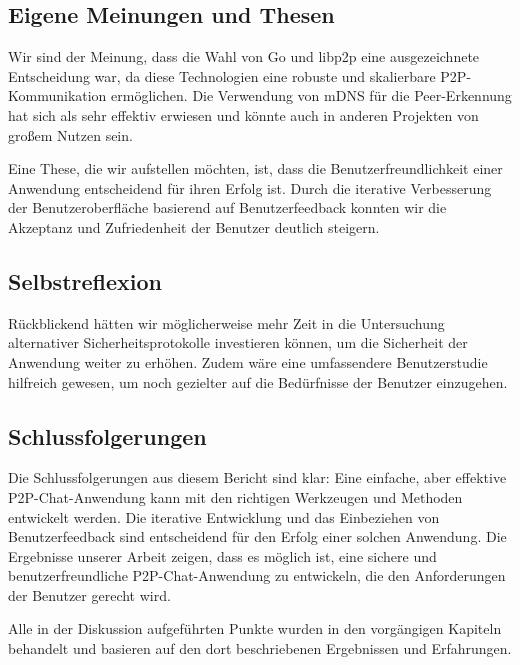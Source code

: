 \subsection{Eigene Meinungen und Thesen}

Wir sind der Meinung, dass die Wahl von Go und libp2p eine ausgezeichnete Entscheidung war, da diese Technologien eine robuste und skalierbare P2P-Kommunikation ermöglichen. Die Verwendung von mDNS für die Peer-Erkennung hat sich als sehr effektiv erwiesen und könnte auch in anderen Projekten von großem Nutzen sein.

Eine These, die wir aufstellen möchten, ist, dass die Benutzerfreundlichkeit einer Anwendung entscheidend für ihren Erfolg ist. Durch die iterative Verbesserung der Benutzeroberfläche basierend auf Benutzerfeedback konnten wir die Akzeptanz und Zufriedenheit der Benutzer deutlich steigern.

\subsection{Selbstreflexion}

Rückblickend hätten wir möglicherweise mehr Zeit in die Untersuchung alternativer Sicherheitsprotokolle investieren können, um die Sicherheit der Anwendung weiter zu erhöhen. Zudem wäre eine umfassendere Benutzerstudie hilfreich gewesen, um noch gezielter auf die Bedürfnisse der Benutzer einzugehen.

\subsection{Schlussfolgerungen}

Die Schlussfolgerungen aus diesem Bericht sind klar: Eine einfache, aber effektive P2P-Chat-Anwendung kann mit den richtigen Werkzeugen und Methoden entwickelt werden. Die iterative Entwicklung und das Einbeziehen von Benutzerfeedback sind entscheidend für den Erfolg einer solchen Anwendung. Die Ergebnisse unserer Arbeit zeigen, dass es möglich ist, eine sichere und benutzerfreundliche P2P-Chat-Anwendung zu entwickeln, die den Anforderungen der Benutzer gerecht wird.

Alle in der Diskussion aufgeführten Punkte wurden in den vorgängigen Kapiteln behandelt und basieren auf den dort beschriebenen Ergebnissen und Erfahrungen.
\newpage
